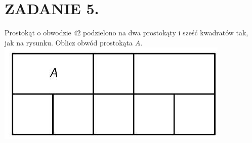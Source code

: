 \documentclass[10pt]{article}
\begin{document}
\section*{ZADANIE 5.}
Prostokąt o obwodzie 42 podzielono na dwa prostokąty i sześć kwadratów tak, jak na rysunku. Oblicz obwód prostokąta \(A\).\\
\includegraphics[max width=\textwidth, center]{2024_11_21_57c1852a5ff6e5801ef3g-1}
\end{document}
